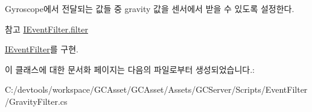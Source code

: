 Gyroscope에서 전달되는 값들 중 gravity 값을 센서에서 받을 수 있도록 설정한다. \begin{DoxySeeAlso}{참고}
\hyperlink{interface_i_event_filter_aa70c90ea957214088b4c4cbb275a6714}{I\+Event\+Filter.\+filter} 
\end{DoxySeeAlso}


\hyperlink{interface_i_event_filter_aa70c90ea957214088b4c4cbb275a6714}{I\+Event\+Filter}를 구현.



이 클래스에 대한 문서화 페이지는 다음의 파일로부터 생성되었습니다.\+:\begin{DoxyCompactItemize}
\item 
C\+:/devtools/workspace/\+G\+C\+Asset/\+G\+C\+Asset/\+Assets/\+G\+C\+Server/\+Scripts/\+Event\+Filter/Gravity\+Filter.\+cs\end{DoxyCompactItemize}
